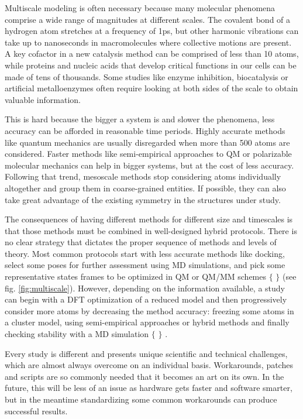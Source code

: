 Multiscale modeling is often necessary because many molecular phenomena comprise a wide range of magnitudes at different scales. The covalent bond of a hydrogen atom stretches at a frequency of 1ps, but other harmonic vibrations can take up to nanoseconds in macromolecules where collective motions are present. A key cofactor in a new catalysis method can be comprised of less than 10 atoms, while proteins and nucleic acids that develop critical functions in our cells can be made of tens of thousands. Some studies like enzyme inhibition, biocatalysis or artificial metalloenzymes often require looking at both sides of the scale to obtain valuable information.

This is hard because the bigger a system is and slower the phenomena, less accuracy can be afforded in reasonable time periods. Highly accurate methods like quantum mechanics are usually disregarded when more than 500 atoms are considered. Faster methods like semi-empirical approaches to QM or polarizable molecular mechanics can help in bigger systems, but at the cost of less accuracy. Following that trend, mesoscale methods stop considering atoms individually altogether and group them in coarse-grained entities. If possible, they can also take great advantage of the existing symmetry in the structures under study.


The consequences of having different methods for different size and timescales is that those methods must be combined in well-designed hybrid protocols. There is no clear strategy that dictates the proper sequence of methods and levels of theory. Most common protocols start with less accurate methods like docking, select some poses for further assessment using MD simulations, and pick some representative states frames to be optimized in QM or QM/MM schemes $ \{ $ $ \} $  (see fig. \ref{fig:multiscale}). However, depending on the information available, a study can begin with a DFT optimization of a reduced model and then progressively consider more atoms by decreasing the method accuracy: freezing some atoms in a cluster model, using semi-empirical approaches or hybrid methods and finally checking stability with a MD simulation $ \{ $ $ \} $ .

Every study is different and presents unique scientific and technical challenges, which are almost always overcome on an individual basis. Workarounds, patches and scripts are so commonly needed that it becomes an art on its own. In the future, this will be less of an issue as hardware gets faster and software smarter, but in the meantime standardizing some common workarounds can produce successful results.


